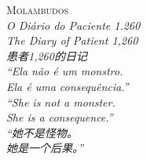 \cleardoublepage
\thispagestyle{empty}
\vspace*{\fill}
\begin{center}
{\scshape\Large Molambudos}\\[0.4em]
{\small\itshape O Diário do Paciente 1.260}\\[0.2em]
{\small\itshape The Diary of Patient 1,260}\\[0.2em]
{\small\itshape 患者1,260的日记}\\[6em]

{\large\itshape
``Ela não é um monstro.\\[0.3em]
Ela é uma consequência.''}\\[3em]

{\large\itshape
``She is not a monster.\\[0.3em]
She is a consequence.''}\\[3em]

{\large\itshape
“她不是怪物。\\[0.3em]
她是一个后果。”}
\end{center}
\vspace*{\fill}
\clearpage
